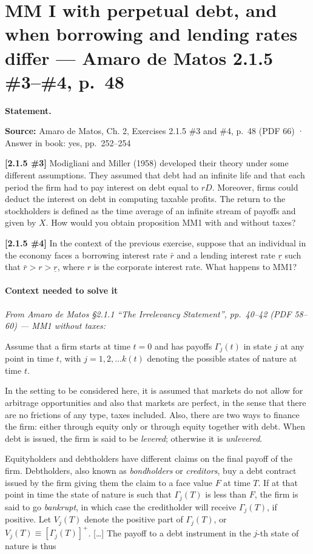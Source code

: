 \documentclass[11pt,a4paper]{article}
\numberwithin{equation}{section}
\newcommand{\stmtbegin}{\par\medskip\noindent\textbf{Statement.}\par\nopagebreak\begingroup\small\setlength{\tabcolsep}{3pt}\sloppy}
\begin{document}
\section{MM I with perpetual debt, and when borrowing and lending rates differ --- Amaro de Matos 2.1.5 \#3--\#4, p.~48}
\stmtbegin
\textbf{Source:} Amaro de Matos, Ch. 2, Exercises 2.1.5 \#3 and \#4, p.~48 (PDF 66) · Answer in
book: yes, pp.~252--254

\textbf{{[}2.1.5 \#3{]}} Modigliani and Miller (1958) developed their theory under some different
assumptions. They assumed that debt had an infinite life and that each period the firm had to pay
interest on debt equal to \(rD\). Moreover, firms could deduct the interest on debt in computing
taxable profits. The return to the stockholders is defined as the time average of an infinite stream
of payoffs and given by \(X\). How would you obtain proposition MM1 with and without taxes?

\textbf{{[}2.1.5 \#4{]}} In the context of the previous exercise, suppose that an individual in the
economy faces a borrowing interest rate \(\bar r\) and a lending interest rate \(\underline{r}\)
such that \(\bar r > r > \underline{r}\), where \(r\) is the corporate interest rate. What happens
to MM1?

\paragraph{Context needed to solve it}

\emph{From Amaro de Matos §2.1.1 ``The Irrelevancy Statement'', pp.~40--42 (PDF 58--60) --- MM1
without taxes:}

Assume that a firm starts at time \(t = 0\) and has payoffs \(\Gamma_j(t)\) in state \(j\) at any
point in time \(t\), with \(j = 1, 2, \dots k(t)\) denoting the possible states of nature at time
\(t\).

In the setting to be considered here, it is assumed that markets do not allow for arbitrage
opportunities and also that markets are perfect, in the sense that there are no frictions of any
type, taxes included. Also, there are two ways to finance the firm: either through equity only or
through equity together with debt. When debt is issued, the firm is said to be \emph{levered};
otherwise it is \emph{unlevered}.

Equityholders and debtholders have different claims on the final payoff of the firm. Debtholders,
also known as \emph{bondholders} or \emph{creditors}, buy a debt contract issued by the firm giving
them the claim to a face value \(F\) at time \(T\). If at that point in time the state of nature is
such that \(\Gamma_j(T)\) is less than \(F\), the firm is said to go \emph{bankrupt}, in which case
the creditholder will receive \(\Gamma_j(T)\), if positive. Let \(V_j(T)\) denote the positive part
of \(\Gamma_j(T)\), or \(V_j(T) \equiv [\Gamma_j(T)]^+\). {[}\ldots{]} The payoff to a debt
instrument in the \(j\)-th state of nature is thus
\end{document}
